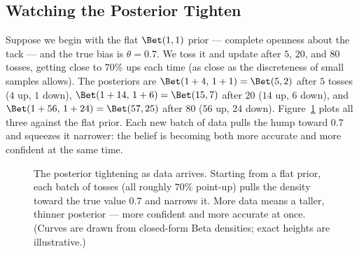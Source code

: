 \subsection{Watching the Posterior Tighten}

Suppose we begin with the flat $\Bet(1,1)$ prior --- complete openness about the tack ---
and the true bias is $\theta = 0.7$. We toss it and update after $5$, $20$, and $80$
tosses, getting close to $70\%$ ups each time (as close as the discreteness of small
samples allows). The posteriors are
$\Bet(1+4,\,1+1)=\Bet(5,2)$ after $5$ tosses ($4$ up, $1$ down),
$\Bet(1+14,\,1+6)=\Bet(15,7)$ after $20$ ($14$ up, $6$ down), and
$\Bet(1+56,\,1+24)=\Bet(57,25)$ after $80$ ($56$ up, $24$ down). Figure~\ref{ch31:fig-tighten} plots all three
against the flat prior. Each new batch of data pulls the hump toward $0.7$ and squeezes it
narrower: the belief is becoming both more accurate and more confident at the same time.

\begin{figure}[H]
\centering
{}
\caption{The posterior tightening as data arrives. Starting from a flat prior, each batch
of tosses (all roughly $70\%$ point-up) pulls the density toward the true value $0.7$ and
narrows it. More data means a taller, thinner posterior --- more confident and more
accurate at once. (Curves are drawn from closed-form Beta densities; exact heights are
illustrative.)}
\label{ch31:fig-tighten}
\end{figure}

